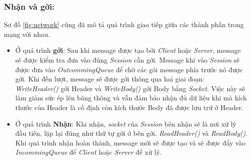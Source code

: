 \subsubsection{Nhận và gởi: }
Sơ đồ \ref{fig:network} cũng đã mô tả quá trình giao tiếp giữa các thành phần trong mạng với nhau. 
\begin{itemize}
	\item Ở quá trình \textbf{gởi}: Sau khi message được tạo bởi \textit{Client} hoặc \textit{Server}, message sẽ được kiểm tra đưa vào đúng \textit{Session} cần gởi. Message khi vào \textit{Session} sẽ được đưa vào \textit{OutcommingQueue} để chờ các gói message phía trước nó được gởi. Khi đến lượt, message sẽ được gởi thông qua hai giai đoạn: \textit{WriteHeader()} gởi Header và \textit{WriteBody()} gởi Body bằng \textit{Socket}. Việc này sẽ làm giảm sức ép lên băng thông và vẫn đảm bảo nhận đủ dữ liệu khi mà kích thước của Header là cố định còn kích thước Body đã được lưu trữ ở Header.
	\item Ở quá trình \textbf{Nhận}: Khi nhận, \textit{socket} của \textit{Session} bên nhận sẽ là nơi xử lý đầu tiên, lặp lại đúng như thứ tự gởi ở bên gởi. \textit{ReadHeader()} và \textit{ReadBody()}. Khi quá trình nhận hoàn thành, message mới sẽ được tạo và sẽ được đẩy vào \textit{IncommingQueue} để \textit{Client} hoặc \textit{Server} để xử lý.
\end{itemize}
